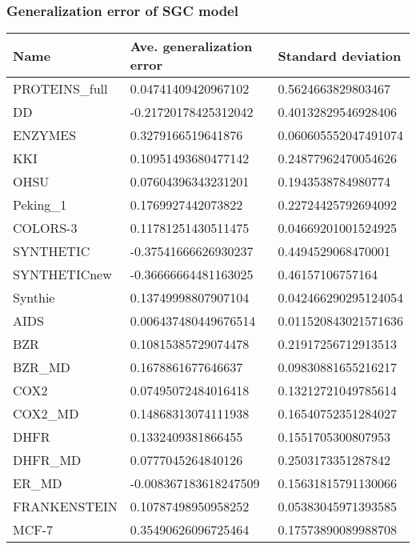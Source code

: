 \documentclass{article}
\begin{document}
\subsubsection{Generalization error of SGC model}
\begin{table}[!ht]
    \centering
    \begin{tabular}{|l|l|l|}
    \hline
        Name & Ave. generalization error & Standard deviation \\ \hline
        PROTEINS\_full & 0.04741409420967102 & 0.5624663829803467 \\ \hline
        DD & -0.21720178425312042 & 0.40132829546928406 \\ \hline
        ENZYMES & 0.3279166519641876 & 0.060605552047491074 \\ \hline
        KKI & 0.10951493680477142 & 0.24877962470054626 \\ \hline
        OHSU & 0.07604396343231201 & 0.1943538784980774 \\ \hline
        Peking\_1 & 0.1769927442073822 & 0.22724425792694092 \\ \hline
        COLORS-3 & 0.11781251430511475 & 0.04669201001524925 \\ \hline
        SYNTHETIC & -0.37541666626930237 & 0.4494529068470001 \\ \hline
        SYNTHETICnew & -0.36666664481163025 & 0.46157106757164 \\ \hline
        Synthie & 0.13749998807907104 & 0.042466290295124054 \\ \hline
        AIDS & 0.006437480449676514 & 0.011520843021571636 \\ \hline
        BZR & 0.10815385729074478 & 0.21917256712913513 \\ \hline
        BZR\_MD & 0.1678861677646637 & 0.09830881655216217 \\ \hline
        COX2 & 0.07495072484016418 & 0.13212721049785614 \\ \hline
        COX2\_MD & 0.14868313074111938 & 0.16540752351284027 \\ \hline
        DHFR & 0.1332409381866455 & 0.1551705300807953 \\ \hline
        DHFR\_MD & 0.0777045264840126 & 0.2503173351287842 \\ \hline
        ER\_MD & -0.008367183618247509 & 0.15631815791130066 \\ \hline
        FRANKENSTEIN & 0.10787498950958252 & 0.05383045971393585 \\ \hline
        MCF-7 & 0.35490626096725464 & 0.17573890089988708 \\ \hline

\end{tabular}
\end{table}
\end{document}
